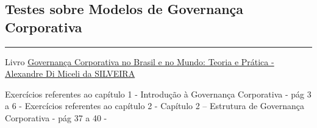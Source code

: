 \documentclass[
]{book}
\begin{document}
\subsection{Testes sobre Modelos de Governança Corporativa}\label{testes-sobre-modelos-de-governanuxe7a-corporativa}

\begin{center}\rule{0.5\linewidth}{0.5pt}\end{center}

Livro \href{https://pdfcoffee.com/governana-corporativa-no-brasil-e-no-mundo-pdf-free.html}{Governança Corporativa no Brasil e no Mundo: Teoria e Prática - Alexandre Di Miceli da SILVEIRA}

Exercícios referentes ao capítulo 1 - Introdução à Governança Corporativa - pág 3 a 6 - Exercícios referentes ao capítulo 2 - Capítulo 2 -- Estrutura de Governança Corporativa - pág 37 a 40 -
\end{document}
